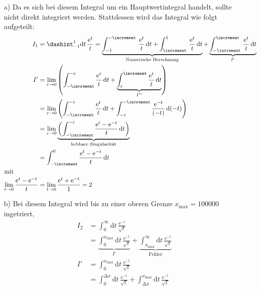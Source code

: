 \begin{itemize}[leftmargin=*]
\item[a)] Da es sich bei diesem Integral um ein Hauptwertintegral handelt, sollte nicht direkt integriert werden. Stattdessen wird das Integral wie folgt aufgeteilt:
          \begin{align*}
          I_1 &= \dashint_{-1}^{1} \text{d} t \,\frac{\text{e}^{t}}{t} = \underbrace{\int_{-1}^{-\increment} \, \frac{\text{e}^{t}}{t} \, \text{d} t + \int_{\increment}^{1} \, \frac{\text{e}^{t}}{t} \, \text{d} t}_{\text{Numerische Berechnung}} + \underbrace{\int_{-\increment}^{\increment} \, \frac{\text{e}^{t}}{t} \, \text{d} t}_{I'} \\
          I' &= \lim_{\varepsilon\to 0} \left(\int_{-\increment}^{-\varepsilon} \frac{\text{e}^{t}}{t}  \, \text{d} t +  \underbrace{\int_{\varepsilon}^{\increment} \frac{\text{e}^{t}}{t}  \, \text{d} t}_{I''}\right) \\
             &= \lim_{\varepsilon\to 0} \left(\int_{-\increment}^{-\varepsilon} \frac{\text{e}^{t}}{t}  \, \text{d} t + \int_{-\varepsilon}^{-\increment} \frac{\text{e}^{-t}}{(-t)}  \, \text{d} (-t)\right) \\
             &= \lim_{\varepsilon\to 0} \underbrace{\left(\int_{-\increment}^{-\varepsilon} \frac{\text{e}^{t}-\text{e}^{-t}}{t}  \, \text{d} t \right)}_{\text{hebbare Singularität}} \\
             &= \int_{-\increment}^{0} \frac{\text{e}^{t}-\text{e}^{-t}}{t}  \, \text{d} t \\
          \intertext{mit}
          \lim_{t \to 0} \frac{\text{e}^{t}-\text{e}^{-t}}{t} &= \lim_{t \to 0} \frac{\text{e}^{t}+\text{e}^{-t}}{1} = 2
          \end{align*}
\item[b)] Bei diesem Integral wird bis zu einer oberen Grenze $x_\text{max} = 100000$ ingetriert,
          \begin{align*}
          I_2 &= \int_0^{\infty} \text{d} t \, \frac{\text{e}^{-t}}{\sqrt{t}} \\
              &=  \underbrace{\int_0^{x_\text{max}} \text{d} t \, \frac{\text{e}^{-t}}{\sqrt{t}}}_{I'} +  \underbrace{\int_{x_\text{max}}^{\infty} \text{d} t \, \frac{\text{e}^{-t}}{\sqrt{t}}}_{\text{Fehler}} \\
          I' &= \int_0^{x_\text{max}} \text{d} t \, \frac{\text{e}^{-t}}{\sqrt{t}} \\
             &= \int_0^{\increment x} \text{d} t \, \frac{\text{e}^{-t}}{\sqrt{t}} + \int_{\increment x}^{x_\text{max}} \text{d} t \, \frac{\text{e}^{-t}}{\sqrt{t}}

\end{align*}
\end{itemize}
